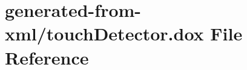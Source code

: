 \hypertarget{touchDetector_8dox}{}\section{generated-\/from-\/xml/touch\+Detector.dox File Reference}
\label{touchDetector_8dox}

